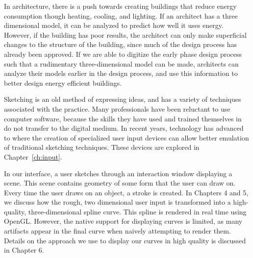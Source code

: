In architecture, there is a push towards creating buildings that reduce energy consumption though heating, cooling, and lighting.
If an architect has a three dimensional model, it can be analyzed to predict how well it uses energy.
However, if the building has poor results, the architect can only make superficial changes to the structure of the building, since much of the design process has already been approved.
If we are able to digitize the early phase design process such that a rudimentary three-dimensional model can be made, architects can analyze their models earlier in the design process, and use this information to better design energy efficient buildings.

Sketching is an old method of expressing ideas, and has a variety of techniques associated with the practice.
Many professionals have been reluctant to use computer software, because the skills they have used and trained themselves in do not transfer to the digital medium.
In recent years, technology has advanced to where the creation of specialized user input devices can allow better emulation of traditional sketching techniques.
These devices are explored in Chapter~\ref{ch:input}.

In our interface, a user sketches through an interaction window displaying a scene.
This scene contains geometry of some form that the user can draw on.
Every time the user draws on an object, a stroke is created.
In Chapters 4 and 5, we discuss how the rough, two dimensional user input is transformed into a high-quality, three-dimensional spline curve.
This spline is rendered in real time using OpenGL.
However, the native support for displaying curves is limited, as many artifacts appear in the final curve when naively attempting to render them.
Details on the approach we use to display our curves in high quality is discussed in Chapter 6.